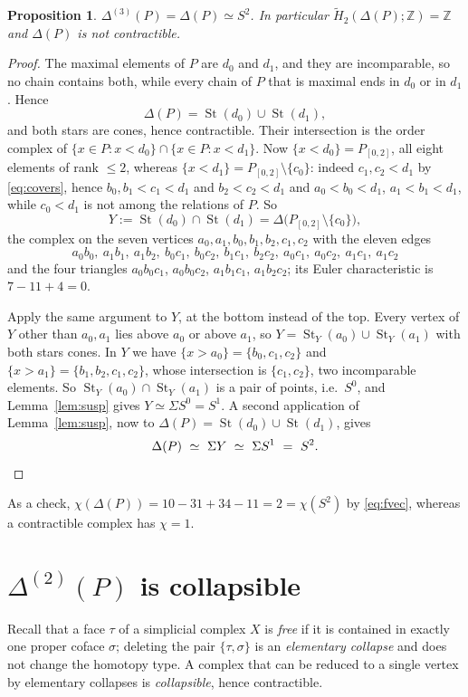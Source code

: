\documentclass[11pt]{amsart}
\newtheorem{proposition}[theorem]{Proposition}
\DeclareMathOperator{\St}{St}
\newcommand{\Dl}{\Delta}
\newcommand{\Susp}{\Sigma}
\newcommand{\ZZ}{\mathbb Z}
\newcommand{\Ho}{\widetilde H}
\begin{document}
\begin{proposition}\label{prop:S2}
$\Dl^{(3)}(P)=\Dl(P)\simeq S^2$. In particular
$\Ho_2(\Dl(P);\ZZ)=\ZZ$ and $\Dl(P)$ is not contractible.
\end{proposition}

\begin{proof}
The maximal elements of $P$ are $d_0$ and $d_1$, and they are incomparable, so
no chain contains both, while every chain of $P$ that is maximal ends in $d_0$
or in $d_1$. Hence
\[
  \Dl(P)=\St(d_0)\cup\St(d_1),
\]
and both stars are cones, hence contractible. Their intersection is the order
complex of $\{x\in P:x<d_0\}\cap\{x\in P:x<d_1\}$. Now
$\{x<d_0\}=P_{[0,2]}$, all eight elements of rank $\le2$, whereas
$\{x<d_1\}=P_{[0,2]}\setminus\{c_0\}$: indeed $c_1,c_2<d_1$ by
\eqref{eq:covers}, hence $b_0,b_1<c_1<d_1$ and $b_2<c_2<d_1$ and
$a_0<b_0<d_1$, $a_1<b_1<d_1$, while $c_0<d_1$ is not among the relations of
$P$. So
\[
  Y:=\St(d_0)\cap\St(d_1)=\Dl\bigl(P_{[0,2]}\setminus\{c_0\}\bigr),
\]
the complex on the seven vertices $a_0,a_1,b_0,b_1,b_2,c_1,c_2$ with the eleven
edges
\[
  a_0b_0,\ a_1b_1,\ a_1b_2,\ b_0c_1,\ b_0c_2,\ b_1c_1,\ b_2c_2,\
  a_0c_1,\ a_0c_2,\ a_1c_1,\ a_1c_2
\]
and the four triangles $a_0b_0c_1$, $a_0b_0c_2$, $a_1b_1c_1$, $a_1b_2c_2$; its
Euler characteristic is $7-11+4=0$.

Apply the same argument to $Y$, at the bottom instead of the top. Every vertex
of $Y$ other than $a_0,a_1$ lies above $a_0$ or above $a_1$, so
$Y=\St_Y(a_0)\cup\St_Y(a_1)$ with both stars cones. In $Y$ we have
$\{x>a_0\}=\{b_0,c_1,c_2\}$ and $\{x>a_1\}=\{b_1,b_2,c_1,c_2\}$, whose
intersection is $\{c_1,c_2\}$, two incomparable elements. So
$\St_Y(a_0)\cap\St_Y(a_1)$ is a pair of points, i.e.\ $S^0$, and
Lemma~\ref{lem:susp} gives $Y\simeq\Susp S^0=S^1$. A second application of
Lemma~\ref{lem:susp}, now to $\Dl(P)=\St(d_0)\cup\St(d_1)$, gives
\[
  \Dl(P)\ \simeq\ \Susp Y\ \simeq\ \Susp S^1\ =\ S^2 .\qedhere
\]
\end{proof}

As a check, $\chi(\Dl(P))=10-31+34-11=2=\chi(S^2)$ by \eqref{eq:fvec},
whereas a contractible complex has $\chi=1$.

\section{$\Dl^{(2)}(P)$ is collapsible}\label{sec:collapse}

Recall that a face $\tau$ of a simplicial complex $X$ is \emph{free} if it is
contained in exactly one proper coface $\sigma$; deleting the pair
$\{\tau,\sigma\}$ is an \emph{elementary collapse} and does not change the
homotopy type. A complex that can be reduced to a single vertex by elementary
collapses is \emph{collapsible}, hence contractible.
\end{document}
